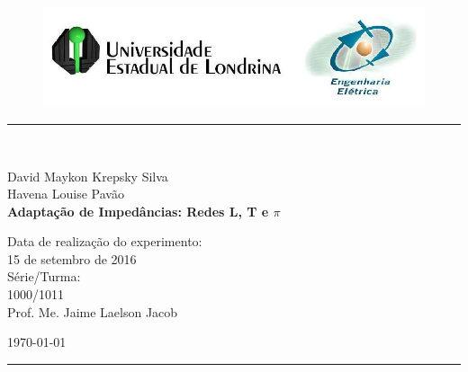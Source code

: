 \begin{titlepage}
\begin{center}
\begin{figure}[h]
\includegraphics[scale=0.76]{Imagens/topdotitulo.png}
\end{figure}
\rule{\columnwidth}{1.5mm}
\

\large David Maykon Krepsky Silva\\
\large Havena Louise Pavão\\

\vspace{4cm}
{\bf \Large Adaptação de Impedâncias: Redes L, T e $\pi$}
\vspace{3.5cm}

\begin{flushright}
Data de realização do experimento:\\
15 de setembro de 2016\\
Série/Turma:\\
1000/1011\\
Prof. Me. Jaime Laelson Jacob 
\end{flushright}

\vspace{3.2cm}
\today

\rule{\columnwidth}{1.3mm}
\end{center}
\end{titlepage}
